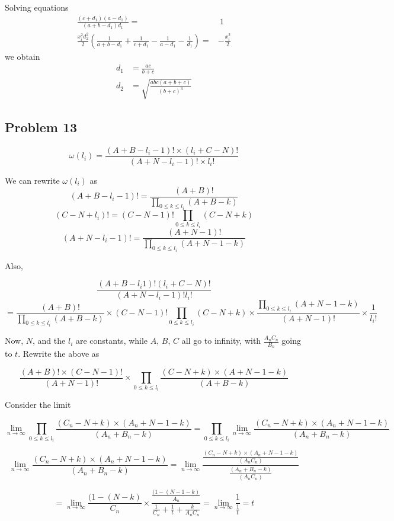 \documentclass[12pt]{article}
\begin{document}
Solving equations
\begin{align*}
	\frac{(c+d_1)(a-d_1)}{(a+b-d_1)d_1} =& \ 1 \\
	 \frac{x_i^2d_2^2}{2}(\frac{1}{a+b-d_1}+\frac{1}{c+d_1}-\frac{1}{a-d_1}-\frac{1}{d_1}) =& -\frac{x_i^2}{2}
\end{align*}
we obtain
\begin{align*}
	d_1 &= \frac{ac}{b+c} \\
	d_2 &= \sqrt{\frac{abc(a+b+c)}{(b+c)^3}}
\end{align*}

	
	\subsection*{Problem 13}

$$\omega(l_i) = \frac{(A + B - l_i - 1)! \times (l_i + C - N)!}{(A + N - l_i - 1)! \times l_i!}$$

We can rewrite $\omega(l_i)$ as
$$(A + B - l_i - 1)! = \frac{(A + B)!}{\prod_{0 \leq k \leq l_i}(A + B - k)}$$
$$ (C - N + l_i)! = (C - N - 1)! \prod_{0 \leq k \leq l_i}(C - N + k)$$
$$(A + N - l_i - 1)! = \frac{(A + N -1)!}{\prod_{0 \leq k \leq l_i}(A + N -1 -k)}$$

Also,

$$\frac{(A +B - l_i 1)! (l_i + C - N)!}{(A + N - l_i - 1)! l_i!}$$
$$=\frac{(A + B)!}{\prod_{0 \leq k \leq l_i} (A + B - k)} \times (C - N - 1)! \prod_{0 \leq k \leq l_i} (C - N + k) \times \frac{\prod_{0 \leq k \leq l_i}(A + N - 1 - k)}{(A + N - 1)!} \times \frac{1}{l_i!}$$

Now, $N$, and the $l_i$ are constants, while $A$, $B$, $C$ all go to infinity, with $\frac{A_n C_n}{B_n}$ going to $t$. Rewrite the above as

$$\frac{(A+ B)! \times (C-N - 1)!}{(A + N- 1)!} \times \prod_{0 \leq k \leq l_i} \frac{(C-N + k)\times (A+N-1-k)}{(A + B - k)}$$

Consider the limit

$$\lim_{n \rightarrow \infty} \prod_{0 \leq k \leq l_i} \frac{(C_n - N + k)\times (A_n + N - 1 - k)}{(A_n + B_n - k)} = \prod_{0 \leq k \leq l_i} \lim_{n \rightarrow \infty} \frac{(C_n - N + k)\times (A_n + N - 1 - k)}{(A_n + B_n - k)}$$

$$\lim_{n \rightarrow \infty} \frac{(C_n - N + k)\times (A_n + N - 1 - k)}{(A_n + B_n - k)} = \lim_{n \rightarrow \infty}\frac{\frac{(C_n - N + k) \times (A_n + N - 1 - k)}{(A_n C_n )}}{\frac{(A_n + B_n - k)}{(A_n C_n)}}$$

$$= \lim_{n \rightarrow \infty} \frac{( 1 - (N - k)}{C_n} \times \frac{\frac{( 1 - (N - 1 - k)}{A_n}}{\frac{1}{C_n} + \frac{1}{t} + \frac{k}{A_n C_n}} = \lim_{n \rightarrow \infty} \frac{1}{\frac{1}{t}} = t$$
\end{document}
